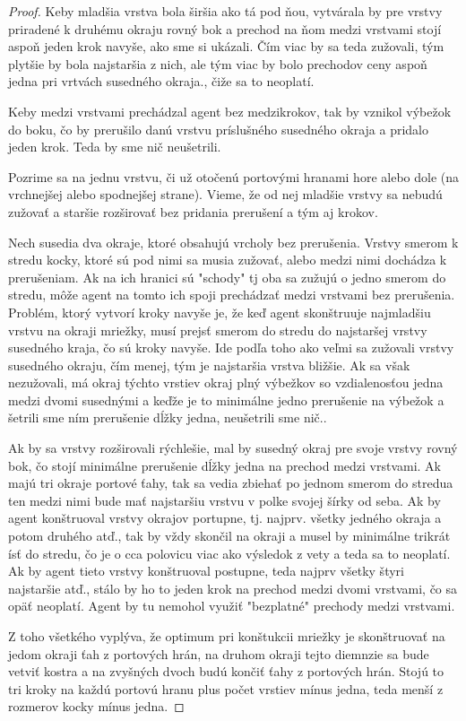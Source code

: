 \begin{proof}
Keby mladšia vrstva bola širšia ako tá pod ňou, vytvárala by pre vrstvy
priradené k druhému okraju rovný bok a prechod na ňom medzi vrstvami stojí
aspoň jeden krok navyše, ako sme si ukázali. Čím viac by sa teda zužovali,
tým plytšie by bola najstaršia z nich, ale tým viac by bolo prechodov ceny
aspoň jedna pri vrtvách susedného okraja., čiže sa to neoplatí.

Keby medzi vrstvami prechádzal agent bez medzikrokov, tak by vznikol výbežok
do boku, čo by prerušilo danú vrstvu príslušného susedného okraja a pridalo
jeden krok. Teda by sme nič neušetrili.

Pozrime sa na jednu vrstvu, či už otočenú portovými hranami hore alebo dole
(na vrchnejšej alebo spodnejšej strane). Vieme, že od nej mladšie vrstvy sa
nebudú zužovať a staršie rozširovať bez pridania prerušení a tým aj krokov.

Nech susedia dva okraje, ktoré obsahujú vrcholy bez prerušenia. Vrstvy
smerom k stredu kocky, ktoré sú pod nimi sa musia zužovať, alebo medzi nimi
dochádza k prerušeniam. Ak na ich hranici sú "schody" tj oba sa zužujú o
jedno smerom do stredu, môže agent na tomto ich spoji prechádzať medzi
vrstvami bez prerušenia. Problém, ktorý vytvorí kroky navyše je, že keď
agent skonštruuje najmladšiu vrstvu na okraji mriežky, musí prejsť smerom do
stredu do najstaršej vrstvy susedného kraja, čo sú kroky navyše. Ide podľa
toho ako veľmi sa zužovali vrstvy susedného okraju, čím menej, tým je
najstaršia vrstva bližšie. Ak sa však nezužovali, má okraj týchto vrstiev
okraj plný výbežkov so vzdialenosťou jedna medzi dvomi susednými a keďže je
to minimálne jedno prerušenie na výbežok a šetrili sme ním prerušenie dĺžky
jedna, neušetrili sme nič..

Ak by sa vrstvy rozširovali rýchlešie, mal by susedný okraj pre svoje  vrstvy
rovný bok, čo stojí minimálne prerušenie dĺžky jedna na prechod medzi
vrstvami. Ak majú tri okraje portové ťahy, tak sa vedia zbiehať po jednom
smerom do stredua ten medzi nimi bude mať najstaršiu vrstvu v polke svojej
šírky od seba. Ak by agent konštruoval vrstvy okrajov portupne, tj. najprv.
všetky jedného okraja a potom druhého atď., tak by vždy skončil na okraji a
musel by minimálne trikrát ísť do stredu, čo je o cca polovicu viac ako
výsledok z vety a teda sa to neoplatí. Ak by agent tieto vrstvy konštruoval
postupne, teda najprv všetky štyri najstaršie atď., stálo by ho to jeden
krok na prechod medzi dvomi vrstvami, čo sa opäť neoplatí. Agent by tu
nemohol využiť "bezplatné" prechody medzi vrstvami.

Z toho všetkého vyplýva, že optimum pri konštukcii mriežky je skonštruovať
na jedom okraji ťah z portových hrán, na druhom okraji tejto diemnzie sa
bude vetviť kostra a na zvyšných dvoch budú končiť ťahy z portových hrán.
Stojú to tri kroky na každú portovú hranu plus počet vrstiev mínus jedna,
teda menší z rozmerov kocky mínus jedna.
\end{proof}



